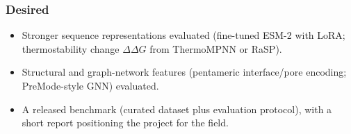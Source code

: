 \documentclass[rnd]{mas_proposal}
\begin{document}
\subsubsection*{Desired}
\begin{itemize}
    \item Stronger sequence representations evaluated (fine-tuned ESM-2 with
    LoRA; thermostability change $\Delta\Delta G$ from ThermoMPNN or RaSP).
    \item Structural and graph-network features (pentameric interface/pore
    encoding; PreMode-style GNN) evaluated.
    \item A released benchmark (curated dataset plus evaluation protocol), with
    a short report positioning the project for the field.
\end{itemize}



\nocite{*}



\end{document}
